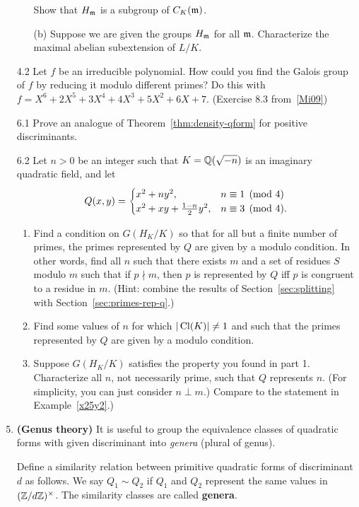 \begin{enumerate}
\begin{enumerate}
\[\]
Show that $H_{\mathfrak{m}}$ is a subgroup of $C_K({\mathfrak{m}})$.
\item[(b)]
Suppose we are given the groups $H_{\mathfrak{m}}$ for all $\mathfrak{m}$. Characterize the maximal abelian subextension of $L/K$.
\end{enumerate}
\item[4.2] Let $f$ be an irreducible polynomial. How could you find the Galois group of $f$ by reducing it modulo different primes? Do this with $f=X^6+2X^5+3X^4+4X^3+5X^2+6X+7$. (Exercise 8.3 from~\ref{Mi09})
\item[6.1] Prove an analogue of Theorem~\ref{thm:density-qform} for positive discriminants.
\item[6.2] Let $n>0$ be an integer such that $K=\mathbb{Q}(\sqrt{-n})$ is an imaginary quadratic field, and let 
\[
Q(x,y)=\begin{cases}
x^2+ny^2,&n\equiv 1\pmod 4\\
x^2+xy+\frac{1-n}{2}y^2,&n\equiv 3 \pmod 4. 
\end{cases}
\]
\begin{enumerate}
\item
Find a condition on $G(H_K/K)$ so that for all but a finite number of primes, the primes represented by $Q$ are given by a modulo condition. In other words, find all $n$ such that there exists $m$ and a set of residues $S$ modulo $m$ such that if $p\nmid m$, then $p$ is represented by $Q$ iff $p$ is congruent to a residue in $m$. (Hint: combine the results of Section~\ref{sec:splitting} with Section~\ref{sec:primes-rep-q}.)
\item
Find some values of $n$ for which $|\operatorname{Cl}(K)|\ne 1$ and such that the primes represented by $Q$ are given by a modulo condition.
\item
Suppose $G(H_K/K)$ satisfies the property you found in part 1. Characterize all $n$, not necessarily prime, such that $Q$ represents $n$. (For simplicity, you can just consider $n\perp m$.) Compare to the statement in Example~\ref{x25y2}.)
\end{enumerate}
\item \textbf{(Genus theory)} It is useful to group the equivalence classes of quadratic forms with given discriminant into {\it genera} (plural of genus).

\begin{df}
Define a similarity relation between primitive quadratic forms of discriminant $d$ as follows. We say $Q_1\sim Q_2$ if $Q_1$ and $Q_2$ represent the same values in $(\mathbb{Z}/d\mathbb{Z})^{\times}$. The similarity classes are called \textbf{genera}.
\end{df}


\end{enumerate}
